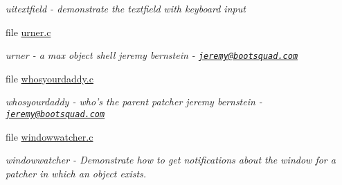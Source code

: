 \begin{DoxyCompactItemize}
\begin{DoxyCompactList}\small\item\em uitextfield -\/ demonstrate the textfield with keyboard input \item\end{DoxyCompactList}\item 
file \hyperlink{urner_8c}{urner.c}


\begin{DoxyCompactList}\small\item\em urner -\/ a max object shell jeremy bernstein -\/ \href{mailto:jeremy@bootsquad.com}{\tt jeremy@bootsquad.com} \item\end{DoxyCompactList}\item 
file \hyperlink{whosyourdaddy_8c}{whosyourdaddy.c}


\begin{DoxyCompactList}\small\item\em whosyourdaddy -\/ who's the parent patcher jeremy bernstein -\/ \href{mailto:jeremy@bootsquad.com}{\tt jeremy@bootsquad.com} \item\end{DoxyCompactList}\item 
file \hyperlink{windowwatcher_8c}{windowwatcher.c}


\begin{DoxyCompactList}\small\item\em windowwatcher -\/ Demonstrate how to get notifications about the window for a patcher in which an object exists. \item\end{DoxyCompactList}\end{DoxyCompactItemize}
